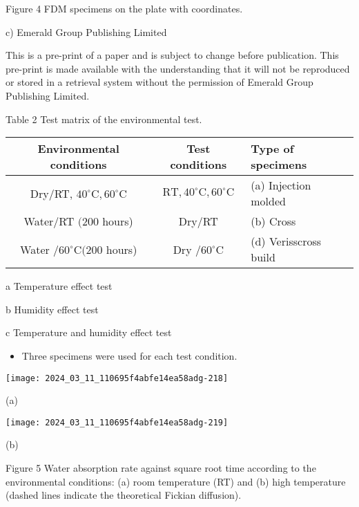 \documentclass[10pt]{article}
\begin{document}
Figure 4 FDM specimens on the plate with coordinates.

c) Emerald Group Publishing Limited

This is a pre-print of a paper and is subject to change before publication. This pre-print is made available with the understanding that it will not be reproduced or stored in a retrieval system without the permission of Emerald Group Publishing Limited.

Table 2 Test matrix of the environmental test.

\begin{center}
\begin{tabular}{ccl}
\hline
Environmental conditions & Test conditions & Type of specimens \\
\hline
Dry/RT, $40^{\circ} \mathrm{C}, 60^{\circ} \mathrm{C}$ & $\mathrm{RT}, 40^{\circ} \mathrm{C}, 60^{\circ} \mathrm{C}$ & (a) Injection molded \\
\hline
Water/RT $(200$ hours) & Dry/RT & (b) Cross \\
\hline
Water $/ 60^{\circ} \mathrm{C}(200$ hours) & Dry $/ 60^{\circ} \mathrm{C}$ & (d) Verisscross build \\
\hline
\end{tabular}
\end{center}

a Temperature effect test

b Humidity effect test

c Temperature and humidity effect test

\begin{itemize}
  \item Three specimens were used for each test condition.
\end{itemize}

\begin{center}
\texttt{[image: 2024\_03\_11\_110695f4abfe14ea58adg-218]}
\end{center}

(a)

\begin{center}
\texttt{[image: 2024\_03\_11\_110695f4abfe14ea58adg-219]}
\end{center}

(b)

Figure 5 Water absorption rate against square root time according to the environmental conditions: (a) room temperature (RT) and (b) high temperature (dashed lines indicate the theoretical Fickian diffusion).
\end{document}
